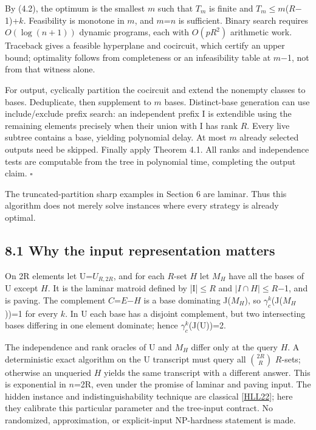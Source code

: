 \documentclass[11pt]{article}
\begin{document}
By (4.2), the optimum is the smallest \(m\) such that \(T_m\) is finite and \(T_m\)\(\le\)\(m\)(\(R\)\ensuremath{-}1)+\(k\). Feasibility is monotone in \(m\), and \(m\)=\(n\) is sufficient. Binary search requires \(O(\log(n+1))\) dynamic programs, each with \(O(pR^2)\) arithmetic work. Traceback gives a feasible hyperplane and cocircuit, which certify an upper bound; optimality follows from completeness or an infeasibility table at \(m\)\ensuremath{-}1, not from that witness alone.

For output, cyclically partition the cocircuit and extend the nonempty classes to bases. Deduplicate, then supplement to \(m\) bases. Distinct-base generation can use include/exclude prefix search: an independent prefix I is extendible using the remaining elements precisely when their union with I has rank \(R\). Every live subtree contains a base, yielding polynomial delay. At most \(m\) already selected outputs need be skipped. Finally apply Theorem 4.1. All ranks and independence tests are computable from the tree in polynomial time, completing the output claim. \hfill\ensuremath{\square}

The truncated-partition sharp examples in Section 6 are laminar. Thus this algorithm does not merely solve instances where every strategy is already optimal.

\subsection*{8.1 Why the input representation matters}

On 2R elements let U=\(U_{R,2R}\), and for each \(R\)-set \(H\) let \(M_H\) have all the bases of U except \(H\). It is the laminar matroid defined by |I|\(\le\)\(R\) and \(|I\cap H|\)\(\le\)\(R\)\ensuremath{-}1, and is paving. The complement \(C\)=\(E\)\ensuremath{-}\(H\) is a base dominating J(\(M_H\)), so \(\gamma_c^k\)(J(\(M_H\)))=1 for every \(k\). In U each base has a disjoint complement, but two intersecting bases differing in one element dominate; hence \(\gamma_c^k\)(J(U))=2.

The independence and rank oracles of U and \(M_H\) differ only at the query \(H\). A deterministic exact algorithm on the U transcript must query all \(\binom{2R}{R}\) \(R\)-sets; otherwise an unqueried \(H\) yields the same transcript with a different answer. This is exponential in \(n\)=2R, even under the promise of laminar and paving input. The hidden instance and indistinguishability technique are classical [\hyperlink{refHLL22}{HLL22}]; here they calibrate this particular parameter and the tree-input contract. No randomized, approximation, or explicit-input NP-hardness statement is made.
\end{document}
